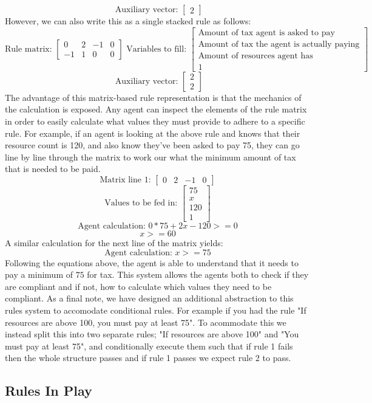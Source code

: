 \[
    \textrm{   Auxiliary vector: } 
    \begin{bmatrix}
        2 
    \end{bmatrix}   
\]
However, we can also write this as a single stacked rule as follows:
\[
    \textrm{Rule matrix: }
    \begin{bmatrix}
        0 & 2 & -1 & 0 \\
        -1 & 1 & 0 & 0 
    \end{bmatrix}
    \textrm{   Variables to fill:  }
    \begin{bmatrix}
        \textrm{Amount of tax agent is asked to pay} \\
        \textrm{Amount of tax the agent is actually paying} \\
        \textrm{Amount of resources agent has} \\
        1
    \end{bmatrix}     
\]
\[
    \textrm{   Auxiliary vector: } 
    \begin{bmatrix}
        2 \\
        2 
    \end{bmatrix}   
\]
The advantage of this matrix-based rule representation is that the mechanics of the calculation is exposed. 
Any agent can inspect the elements of the rule matrix in order to easily calculate what values they must provide to adhere to a specific rule.
For example, if an agent is looking at the above rule and knows that their resource count is 120, and also know they've been asked to pay 75, they can go line by line through the matrix to work our what the minimum amount of tax that is needed to be paid.
\[
    \textrm{Matrix line 1: }
    \begin{bmatrix}
        0 & 2 & -1 & 0
    \end{bmatrix}
\]
\[
    \textrm{Values to be fed in: }
    \begin{bmatrix}
        75 \\
        x \\
        120 \\
        1
    \end{bmatrix}
\]
\[
    \textrm{Agent calculation: }
    0*75 + 2x -120 >= 0
\]
\[
    x >= 60
\]
A similar calculation for the next line of the matrix yields:
\[
    \textrm{Agent calculation: }
    x >= 75
\]
Following the equations above, the agent is able to understand that it needs to pay a minimum of $75$ for tax. This system allows the agents both to check if they are compliant and if not, how to calculate which values they need to be compliant.
As a final note, we have designed an additional abstraction to this rules system to accomodate conditional rules.
For example if you had the rule "If resources are above 100, you must pay at least 75". 
To acommodate this we instead split this into two separate rules; "If resources are above 100" and "You must pay at least 75", and conditionally execute them such that if rule 1 fails then the whole structure passes and if rule 1 passes we expect rule 2 to pass.

\subsection{Rules In Play}
